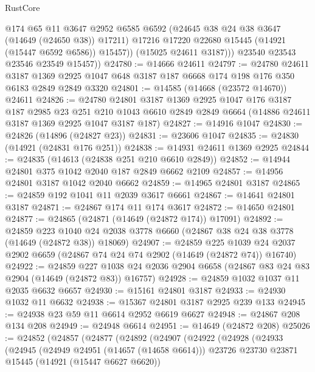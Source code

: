 \begin{lexlean}{RustCore}
\begin{coremodule}
                @174
                @65
                @11
                @3647
                @2952
                @6585
                @6592
                (@24645 @38 @24 @38 @3647 (@14649 (@24650 @38)) @17211)
                @17216
                @17220
                @22680
                @15445
                (@14921 (@15447 @6592 @6586))
                @15457))
            (@15025 @24611 @3187)))
        @23540
        @23543
        @23546
        @23549
        @15457))
@24780 := @14666 @24611
@24797 := @24780
    @24611
    @3187
    @1369
    @2925
    @1047
    @648
    @3187
    @187
    @6668
    @174
    @198
    @176
    @350
    @6183
    @2849
    @2849
    @3320
@24801 := @14585 (@14668 (@23572 @14670)) @24611
@24826 := @24780
    @24801
    @3187
    @1369
    @2925
    @1047
    @176
    @3187
    @187
    @2985
    @23
    @251
    @210
    @1043
    @6610
    @2849
    @2849
    @6664
    (@14886 @24611 @3187 @1369 @2925 @1047 @3187 @187)
@24827 := @14916 @1047
@24830 := @24826 (@14896 (@24827 @23))
@24831 := @23606 @1047
@24835 := @24830 (@14921 (@24831 @176 @251))
@24838 := @14931 @24611 @1369 @2925
@24844 := @24835 (@14613 (@24838 @251 @210 @6610 @2849))
@24852 := @14944 @24801 @375 @1042 @2040 @187 @2849 @6662 @2109
@24857 := @14956 @24801 @3187 @1042 @2040 @6662
@24859 := @14965 @24801 @3187
@24865 := @24859 @192 @1041 @11 @2039 @3617 @6661
@24867 := @14641 @24801 @3187
@24871 := @24867 @174 @11 @174 @3617
@24872 := @14650 @24801
@24877 := @24865 (@24871 (@14649 (@24872 @174)) @17091)
@24892 := @24859
    @223
    @1040
    @24
    @2038
    @3778
    @6660
    (@24867 @38 @24 @38 @3778 (@14649 (@24872 @38)) @18069)
@24907 := @24859
    @225
    @1039
    @24
    @2037
    @2902
    @6659
    (@24867 @74 @24 @74 @2902 (@14649 (@24872 @74)) @16740)
@24922 := @24859
    @227
    @1038
    @24
    @2036
    @2904
    @6658
    (@24867 @83 @24 @83 @2904 (@14649 (@24872 @83)) @16757)
@24928 := @24859 @1032 @1037 @11 @2035 @6632 @6657
@24930 := @15161 @24801 @3187
@24933 := @24930 @1032 @11 @6632
@24938 := @15367 @24801 @3187 @2925 @239 @133
@24945 := @24938 @23 @59 @11 @6614 @2952 @6619 @6627
@24948 := @24867 @208 @134 @208
@24949 := @24948 @6614
@24951 := @14649 (@24872 @208)
@25026 := @24852
    (@24857
      (@24877
        (@24892
          (@24907
            (@24922
              (@24928
                (@24933
                  (@24945
                    (@24949 @24951 (@14657 (@14658 @6614)))
                    @23726
                    @23730
                    @23871
                    @15445
                    (@14921 (@15447 @6627 @6620))

\end{coremodule}
\end{lexlean}
